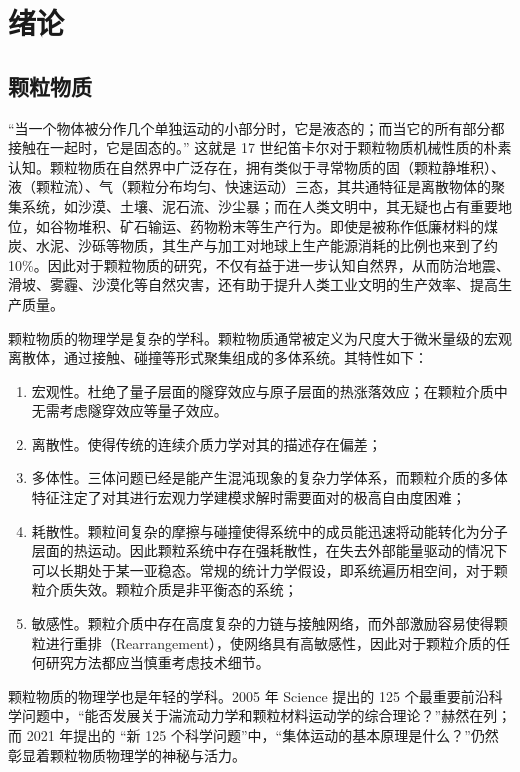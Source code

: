 
\chapter{绪论}

\section{颗粒物质}

“当一个物体被分作几个单独运动的小部分时，它是液态的；而当它的所有部分都接触在一起时，它是固态的。” 这就是 17 世纪笛卡尔对于颗粒物质机械性质的朴素认知。颗粒物质在自然界中广泛存在，拥有类似于寻常物质的固（颗粒静堆积）、液（颗粒流）、气（颗粒分布均匀、快速运动）三态\cite{RevModPhys.68.1259}，其共通特征是离散物体的聚集系统，如沙漠、土壤、泥石流、沙尘暴；而在人类文明中，其无疑也占有重要地位，如谷物堆积、矿石输运、药物粉末等生产行为。即使是被称作低廉材料的煤炭、水泥、沙砾等物质，其生产与加工对地球上生产能源消耗的比例也来到了约 \num{10}\%\cite{duran2000sands}。因此对于颗粒物质的研究，不仅有益于进一步认知自然界，从而防治地震、滑坡、雾霾、沙漠化等自然灾害，还有助于提升人类工业文明的生产效率、提高生产质量。

颗粒物质的物理学是复杂的学科。颗粒物质通常被定义为尺度大于微米量级的宏观离散体，通过接触、碰撞等形式聚集组成的多体系统。其特性如下：

\begin{enumerate}
  \item 宏观性。杜绝了量子层面的隧穿效应与原子层面的热涨落效应；在颗粒介质中无需考虑隧穿效应等量子效应。
  \item 离散性。使得传统的连续介质力学对其的描述存在偏差\cite{RevModPhys.71.435}；
  \item 多体性。三体问题已经是能产生混沌现象的复杂力学体系，而颗粒介质的多体特征注定了对其进行宏观力学建模求解时需要面对的极高自由度困难；
  \item 耗散性。颗粒间复杂的摩擦与碰撞使得系统中的成员能迅速将动能转化为分子层面的热运动。因此颗粒系统中存在强耗散性，在失去外部能量驱动的情况下可以长期处于某一亚稳态。常规的统计力学假设，即系统遍历相空间，对于颗粒介质失效。颗粒介质是非平衡态的系统；
  \item 敏感性。颗粒介质中存在高度复杂的力链与接触网络，而外部激励容易使得颗粒进行重排（Rearrangement），使网络具有高敏感性，因此对于颗粒介质的任何研究方法都应当慎重考虑技术细节。
\end{enumerate}

颗粒物质的物理学也是年轻的学科。2005 年 Science 提出的 125 个最重要前沿科学问题\cite{doi:10.1126/science.309.5731.78b}中，“能否发展关于湍流动力学和颗粒材料运动学的综合理论？”赫然在列；而 2021 年提出的 “新 125 个科学问题”\cite{sanders2021125}中，“集体运动的基本原理是什么？”仍然彰显着颗粒物质物理学的神秘与活力。

